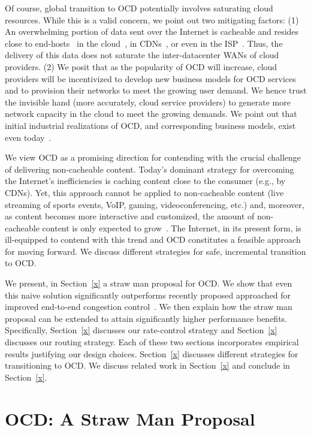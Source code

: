 \documentclass[10pt,sigconf]{acmart}
\begin{document}
Of course, global transition to OCD potentially involves saturating cloud resources. While this is a valid concern, we point out two mitigating factors: (1) An overwhelming portion of data sent over the Internet is cacheable and resides close to end-hosts~\cite{x,y,z} in the cloud~\cite{x,y,z}, in CDNs~\cite{x,y,z}, or even in the ISP~\cite{x,y,z}. Thus, the delivery of this data does not saturate the inter-datacenter WANs of cloud providers. (2) We posit that as the popularity of OCD will increase, cloud providers will be incentivized to develop new business models for OCD services and to provision their networks to meet the growing user demand. We hence trust the invisible hand (more accurately, cloud service providers) to generate more network capacity in the cloud to meet the growing demands. We point out that initial industrial realizations of OCD, and corresponding business models, exist even today~\cite{VMware?,teridion}.

We view OCD as a promising direction for contending with the crucial challenge of delivering non-cacheable content. Today's dominant strategy for overcoming the Internet's inefficiencies is caching content close to the consumer (e.g., by CDNs). Yet, this approach cannot be applied to non-cacheable content (live streaming of sports events, VoIP, gaming, videoconferencing, etc.) and, moreover, as content becomes more interactive and customized, the amount of non-cacheable content is only expected to grow~\cite{x,y,z}. The Internet, in its present form, is ill-equipped to contend with this trend and OCD constitutes a feasible approach for moving forward. We discuss different strategies for safe, incremental transition to OCD.

\vspace{0.1in} We present, in Section~\ref{x} a straw man proposal for OCD. We show that even this naive solution significantly outperforms recently proposed approached for improved end-to-end congestion control~\cite{BBR, PCC}. We then explain how the straw man proposal can be extended to attain significantly higher performance benefits. Specifically, Section~\ref{x} discusses our rate-control strategy and Section~\ref{x} discusses our routing strategy. Each of these two sections incorporates empirical results justifying our design choices. Section~\ref{x} discusses different strategies for transitioning to OCD. We discuss related work in Section~\ref{x} and conclude in Section~\ref{x}.

\section{OCD: A Straw Man Proposal}\label{sec:straw_man}
\end{document}
